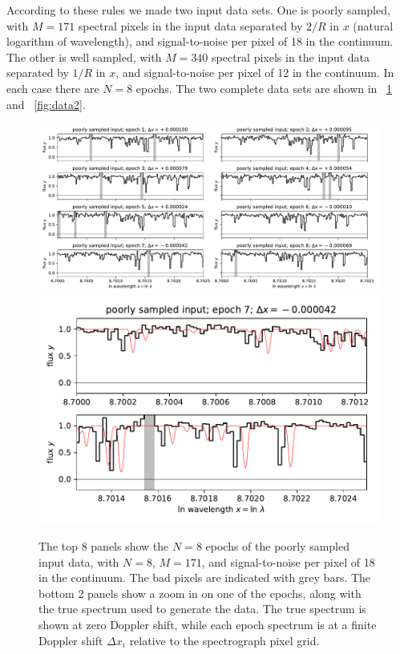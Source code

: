 \documentclass[modern]{aastex631}
\newlength{\figurewidth}
\begin{document}
According to these rules we made two input data sets.
One is poorly sampled, with $M=171$ spectral pixels in the input data separated by $2/R$ in $x$ (natural logarithm of wavelength), and signal-to-noise per pixel of 18 in the continuum.
The other is well sampled, with $M=340$ spectral pixels in the input data separated by $1/R$ in $x$, and signal-to-noise per pixel of 12 in the continuum.
In each case there are $N=8$ epochs.
The two complete data sets are shown in \figurename~\ref{fig:data1} and \figurename~\ref{fig:data2}.
\begin{figure}[t!]
    \begin{mdframed}\begin{center}
    \includegraphics[width=1.3\figurewidth]{notebooks/data1.pdf}\\
    \includegraphics[width=\figurewidth]{notebooks/datazoom.pdf}
    \end{center}
    \caption{The top 8 panels show the $N=8$ epochs of the poorly sampled input data, with $N=8$, $M=171$, and signal-to-noise per pixel of 18 in the continuum. The bad pixels are indicated with grey bars. The bottom 2 panels show a zoom in on one of the epochs, along with the true spectrum used to generate the data. The true spectrum is shown at zero Doppler shift, while each epoch spectrum is at a finite Doppler shift $\Delta x_i$ relative to the spectrograph pixel grid.\label{fig:data1}}
    \end{mdframed}
\end{figure}
\end{document}
